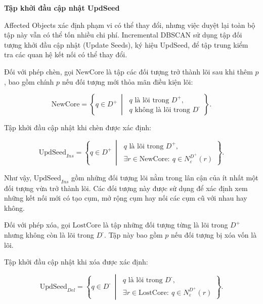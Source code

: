 \textbf{Tập khởi đầu cập nhật UpdSeed}

Affected Objects xác định phạm vi có thể thay đổi, nhưng việc duyệt lại toàn bộ tập này vẫn có thể tốn nhiều chi phí. Incremental DBSCAN sử dụng tập đối tượng khởi đầu cập nhật (Update Seeds), ký hiệu UpdSeed, để tập trung kiểm tra các quan hệ kết nối có thể thay đổi.

Đối với phép chèn, gọi \(\mathrm{NewCore}\) là tập các đối tượng trở thành lõi sau khi thêm \(p\), bao gồm chính \(p\) nếu đối tượng mới thỏa mãn điều kiện lõi:

\begin{equation}
\mathrm{NewCore}=
\left\{
q\in D^{+}\ \middle|\
\begin{array}{l}
q\text{ là lõi trong }D^{+},\\
q\text{ không là lõi trong }D^{\text{-}}
\end{array}
\right\}.
\end{equation}

Tập khởi đầu cập nhật khi chèn được xác định:

\begin{equation}
\mathrm{UpdSeed}_{Ins}
=
\left\{
q\in D^{+}\ \middle|\
\begin{array}{l}
q\text{ là lõi trong }D^{+},\\
\exists r\in\mathrm{NewCore}:\
q\in N_{\varepsilon}^{D^{+}}(r)
\end{array}
\right\}.
\end{equation}

Như vậy, \(\mathrm{UpdSeed}_{Ins}\) gồm những đối tượng lõi nằm trong lân cận của ít nhất một đối tượng vừa trở thành lõi. Các đối tượng này được sử dụng để xác định xem những kết nối mới có tạo cụm, mở rộng cụm hay nối các cụm cũ với nhau hay không.

Đối với phép xóa, gọi \(\mathrm{LostCore}\) là tập những đối tượng từng là lõi trong \(D^{+}\) nhưng không còn là lõi trong \(D^{\text{-}}\). Tập này bao gồm \(p\) nếu đối tượng bị xóa vốn là lõi.

Tập khởi đầu cập nhật khi xóa được xác định:

\begin{equation}
\mathrm{UpdSeed}_{Del}
=
\left\{
q\in D^{\text{-}}\ \middle|\
\begin{array}{l}
q\text{ là lõi trong }D^{\text{-}},\\
\exists r\in\mathrm{LostCore}:\
q\in N_{\varepsilon}^{D^{+}}(r)
\end{array}
\right\}.
\end{equation}

